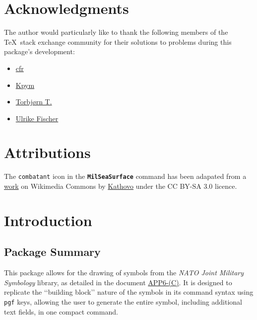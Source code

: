 \documentclass[a4paper, titlepage]{article}
\newcommand\DocLink{\href{https://www.awl.edu.pl/images/en/APP_6_C.pdf}{APP6-(C)}}
\begin{document}
\clearpage

\begin{versionhistory}
\renewcommand \vhAuthorColWidth{6cm}
\end{versionhistory}

\clearpage

\section*{Acknowledgments}

The author would particularly like to thank the following members of the \TeX\  stack exchange community for their solutions to problems during this package\rq{}s development:

\begin{itemize}
\item \href{https://tex.stackexchange.com/users/39222}{cfr}
\item \href{https://tex.stackexchange.com/users/9335}{Kpym}
\item \href{https://tex.stackexchange.com/users/586}{Torbj\o rn T.}
\item \href{https://tex.stackexchange.com/users/2388}{Ulrike Fischer}
\end{itemize}

\section*{Attributions}

The \texttt{combatant} icon in the \textbf{\texttt{MilSeaSurface}} command has been adapated from a \href{https://commons.wikimedia.org/wiki/File:Small_battle_symbol.svg}{work} on Wikimedia Commons by \href{https://commons.wikimedia.org/wiki/User:Kathovo}{Kathovo} under the CC BY-SA 3.0 licence.

\clearpage

\tableofcontents

\clearpage

\section{Introduction}

\subsection{Package Summary}

This package allows for the drawing of symbols from the \textit{NATO Joint Military Symbology} library, as detailed in the document \DocLink. It is designed to replicate the \lq\lq{}building block\rq\rq{} nature of the symbols in its command syntax using \texttt{pgf} keys, allowing the user to generate the entire symbol, including additional text fields, in one compact command.
\end{document}
